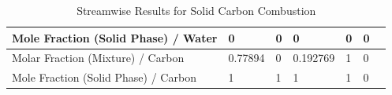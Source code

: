 \documentclass[a4paper,12pt]{article}
\begin{document}
\begin{table}[ht]
{\begin{tabular}{|l|l|l|l|l|l|l|}
Mole Fraction (Solid Phase)  /  Water          & 0              & 0         & 0           & 0           & 0         &               \\ \hline
Molar Fraction (Mixture)  /  Carbon            & 0.77894        & 0         & 0.192769    & 1           & 0         &               \\ \hline
Mole Fraction (Solid Phase)  /  Carbon         & 1              & 1         & 1           & 1           & 0         &               \\ \hline
\end{tabular}%
}
\caption{Streamwise Results for Solid Carbon Combustion}
\end{table}
\end{document}
